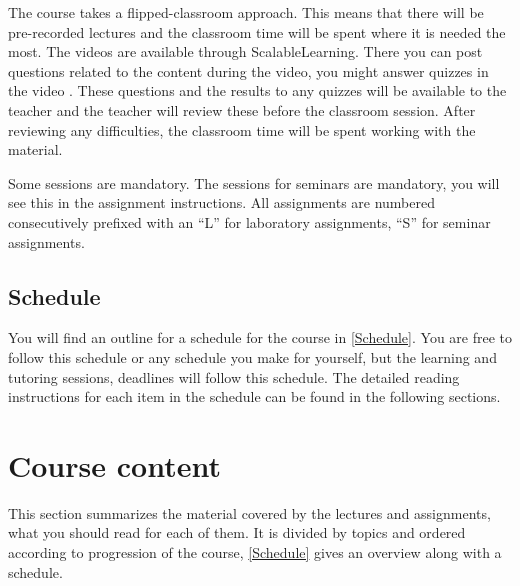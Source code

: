 The course takes a flipped-classroom approach.
This means that there will be pre-recorded lectures and the classroom time will 
be spent where it is needed the most.
The videos are available through ScalableLearning.
There you can post questions related to the content during the video, you might
answer quizzes in the video \etc.
These questions and the results to any quizzes will be available to the teacher 
and the teacher will review these before the classroom session.
After reviewing any difficulties, the classroom time will be spent working with 
the material.

Some sessions are mandatory.
The sessions for seminars are mandatory, you will see this in the assignment 
instructions.
All assignments are numbered consecutively prefixed with an \enquote{L} for 
laboratory assignments, \enquote{S} for seminar assignments.

\subsection{Schedule}

You will find an outline for a schedule for the course in \cref{Schedule}.
You are free to follow this schedule or any schedule you make for yourself, but 
the learning and tutoring sessions, deadlines \etc will follow this schedule.
The detailed reading instructions for each item in the schedule can be found in 
the following sections.

\begin{frame}[allowframebreaks]

\end{frame}


\section<article>{Course content}

This section summarizes the material covered by the lectures and assignments, 
\ie what you should read for each of them.
It is divided by topics and ordered according to progression of the course, 
\cref{Schedule} gives an overview along with a schedule.

